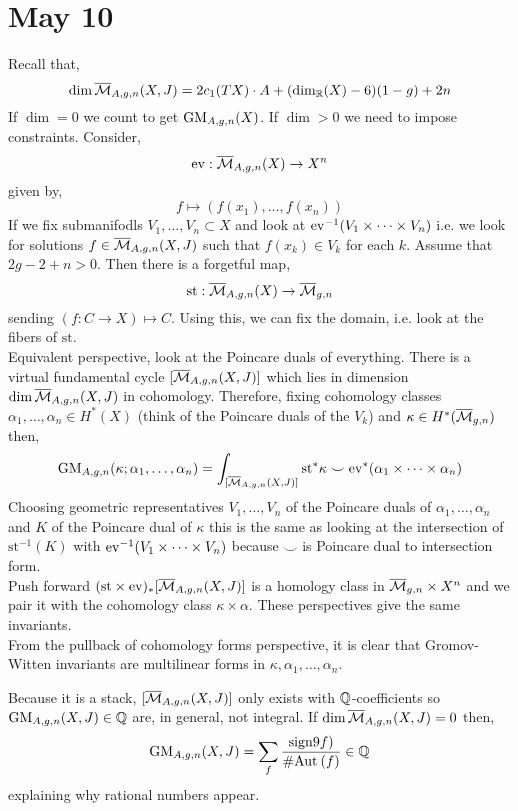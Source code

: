 \documentclass[12pt]{article}
\begin{document}
\section{May 10}

\newcommand{\st}{\mathrm{st}}

Recall that,
\[ \dim{\overline{\mathcal{M}}_{A,g,n}(X,J)} = 2 c_1(T X) \cdot A + (\dim_{\mathbb{R}}(X) - 6)(1-g) + 2 n \]
If $\dim = 0$ we count to get $\mathrm{GM}_{A,g,n}(X)$. If $\dim > 0$ we need to impose constraints. Consider,
\[ \mathrm{ev} : \overline{\mathcal{M}}_{A,g,n}(X) \to X^n \]
given by,
\[ f \mapsto (f(x_1), \dots, f(x_n)) \]
If we fix submanifodls $V_1, \dots, V_n \subset X$ and look at $\mathrm{ev}^{-1}(V_1 \times \cdots \times V_n)$ i.e. we look for solutions $f \in \overline{\mathcal{M}}_{A,g,n}(X, J)$ such that $f(x_k) \in V_k$ for each $k$. Assume that $2g - 2 + n > 0$. Then there is a forgetful map,
\[ \st : \Mbar_{A,g,n}(X) \to \Mbar_{g,n} \]
sending $(f : C \to X) \mapsto C$. Using this, we can fix the domain, i.e. look at the fibers of $\st$.
\bigskip\\
Equivalent perspective, look at the Poincare duals of everything. There is a virtual fundamental cycle $[\overline{\mathcal{M}}_{A,g,n}(X,J)]$ which lies in dimension $\dim{\overline{\mathcal{M}}_{A,g,n}(X,J)}$ in cohomology. Therefore, fixing cohomology classes $\alpha_1, \dots, \alpha_n \in H^*(X)$ (think of the Poincare duals of the $V_k$) and $\kappa \in H^*(\overline{\mathcal{M}}_{g,n})$ then,
\[ \GM_{A,g,n}(\kappa ; \alpha_1, \dots, \alpha_n) = \int_{[ \Mbar_{A,g,n}(X, J)]} \st^* \kappa \smile \ev^* (\alpha_1 \times \cdots \times \alpha_n) \] 
Choosing geometric representatives $V_1, \dots, V_n$ of the Poincare duals of $\alpha_1, \dots, \alpha_n$ and $K$ of the Poincare dual of $\kappa$ this is the same as looking at the intersection of $\st^{-1}(K)$ with $\mathrm{ev}^{-1}(V_1 \times \cdots \times V_n)$ because $\smile$ is Poincare dual to intersection form. 
\bigskip\\
Push forward $(\st \times \ev)_* [\Mbar_{A,g,n}(X,J)]$ is a homology class in $\overline{\mathcal{M}}_{g,n} \times X^n$ and we pair it with the cohomology class $\kappa \times \alpha$. These perspectives give the same invariants. 
\bigskip\\
From the pullback of cohomology forms perspective, it is clear that Gromov-Witten invariants are multilinear forms in $\kappa, \alpha_1, \dots, \alpha_n$. 

\begin{rmk}
Because it is a stack, $[\overline{\mathcal{M}}_{A,g,n}(X,J)]$ only exists with $\mathbb{Q}$-coefficients so $\mathrm{GM}_{A,g,n}(X, J) \in \mathbb{Q}$ are, in general, not integral. If $\dim{\overline{\mathcal{M}}_{A,g,n}(X,J)} = 0$ then,
\[ \mathrm{GM}_{A,g,n}(X,J) = \sum_{f} \frac{\mathrm{sign}9f)}{\# \mathrm{Aut}_{} \left( f \right)} \in \mathbb{Q} \]
explaining why rational numbers appear. 
\end{rmk}
\end{document}
